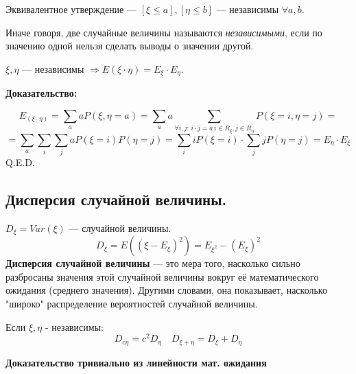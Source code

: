 Эквивалентное утверждение --- $[\xi\leq a], [\eta\leq b]$ --- независимы $\forall a,b$.

Иначе говоря, две случайные величины называются \emph{независимыми}, если по значению одной нельзя сделать выводы о значении другой.


$\xi,\eta$ --- независимы $\Rightarrow E(\xi\cdot\eta)=E_{\xi}\cdot E_{\eta}$.

\textbf{Доказательство:}

$$E_{(\xi\cdot \eta)}=\sum\limits_{a}a P(\xi,\eta = a) = 
\sum\limits_{a}a\sum\limits_{\forall i,j: \,i\cdot j= a \, i \in R_{\xi},j\in R_{\eta}}P(\xi = i, \eta = j) =$$ $$= \sum\limits_{a}\sum\limits_{i}\sum\limits_{j} aP(\xi=i) P(\eta = j) = \sum\limits_{i}iP(\xi=i)\cdot \sum\limits_{j}jP(\eta=j) = E_{\eta}\cdot E_{\xi}$$
\hfill Q.E.D.

\subsection{Дисперсия случайной величины.}
$D_{\xi} = Var(\xi)$ ---  случайной величины. 
$$D_{\xi}= E((\xi - E_{\xi})^2)= E_{\xi^2}-(E_{\xi})^2$$
\textbf{Дисперсия случайной величины} --- это мера того, насколько сильно разбросаны значения этой случайной величины вокруг её математического ожидания (среднего значения). Другими словами, она показывает, насколько "широко" распределение вероятностей случайной величины.

Если $\xi,\eta$ - независимы:
$$D_{c\eta} = c^2 D_{\eta}\quad D_{\xi+\eta}=D_{\xi}+D_{\eta}$$

\textbf{Доказательство тривиально из линейности мат. ожидания}